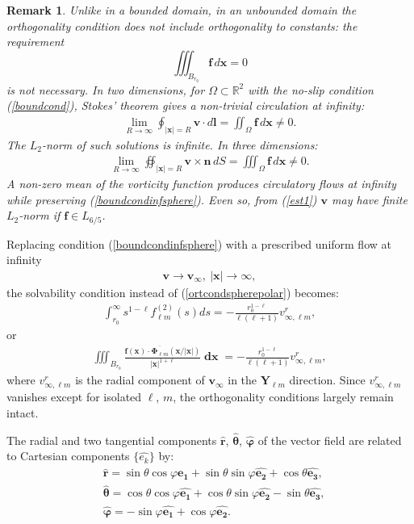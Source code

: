 \documentclass[a4paper]{article}
\newcommand{\R}{\mathbb{R}}
\newcommand{\bx}{\mathbf{x}}
\newcommand{\bff}{\mathbf{f}}
\newcommand{\dx}{\operatorname{\mathbf{dx}}}
\newcommand{\bv}{\mathbf{v}}
\newcommand{\bn}{\mathbf{n}}
\newtheorem{remark*}{Remark}[]
\begin{document}
\begin{remark*}
Unlike in a bounded domain, in an unbounded domain the orthogonality condition does not include orthogonality to constants: the requirement
$$\iiint_{B_{r_0}}\bff \,d\mathbf{x}=0$$
is not necessary. In two dimensions, for $\Omega \subset \R^2$ with the no-slip condition (\ref{boundcond}), Stokes' theorem gives a non-trivial circulation at infinity:
\begin{align*}
\lim_{R\to\infty}\oint_{\vert\bx\vert=R} \bv \cdot d\mathbf{l} = \iint_{\Omega}\bff \,d\mathbf{x} \neq 0.
\end{align*}
The $L_2$-norm of such solutions is infinite. In three dimensions:
\begin{align*}
\lim_{R\to\infty}\oiint_{\vert\bx\vert=R} \bv \times \bn \, dS = \iiint_{\Omega}\bff \,d\mathbf{x} \neq 0.
\end{align*}
A non-zero mean of the vorticity function produces circulatory flows at infinity while preserving (\ref{boundcondinfsphere}). Even so, from (\ref{est1}) $\bv$ may have finite $L_2$-norm if $\bff \in L_{6/5}$.
\end{remark*}

\vskip 0.5cm
Replacing condition (\ref{boundcondinfsphere}) with a prescribed uniform flow at infinity
\begin{align}
\bv \to \bv_\infty,~|\bx|\to \infty, \label{boundcondinfsphere2}
\end{align}
the solvability condition instead of (\ref{ortcondspherepolar}) becomes:
\begin{align*} 
\int_{r_0}^\infty
s^{1-\ell}  f_{\ell m}^{(2)}(s)ds = - \frac{r_0^{1-\ell}}{\ell (\ell +1)} v_{\infty, \ell m}^{r},
\end{align*}
or
\begin{align*}
\iiint_{B_{r_0}} \frac{\bff(\bx) \cdot \overline{\mathbf {\Phi}_{\ell m}}\left (\bx/|\bx| \right )}
{|\bx|^{1 + \ell}} \dx = - \frac{r_0^{1-\ell}}{\ell (\ell +1)} v_{\infty, \ell m}^{r},
\end{align*}
where $v_{\infty, \ell m}^{r}$ is the radial component of $\bv_\infty$ in the $\mathbf{Y}_{\ell m}$ direction. Since $v_{\infty, \ell m}^{r}$ vanishes except for isolated $\ell$, $m$, the orthogonality conditions largely remain intact.

The radial and two tangential components $\hat{\mathbf{r}}$, $\hat{\boldsymbol{\theta}}$, $\hat{\boldsymbol{\varphi}}$ of the vector field are related to Cartesian components $\{ \hat {e_k}\}$ by:
\begin{align*}
&\hat {\mathbf  r}=\sin \theta \cos \varphi {\boldsymbol {\hat {e_1 }}}+\sin \theta \sin \varphi {\boldsymbol {\hat {e_2 }}}+\cos \theta {\boldsymbol {\hat {e_3}}},\\
&\hat {\mathbf \theta }=\cos \theta \cos \varphi {\boldsymbol {\hat {e_1 }}}+\cos \theta \sin \varphi {\boldsymbol {\hat {e_2 }}}-\sin \theta {\boldsymbol {\hat {e_3}}},\\
&\hat {\mathbf \varphi }=-\sin \varphi {\boldsymbol {\hat {e_1 }}}+\cos \varphi {\boldsymbol {\hat {e_2 }}}.
\end{align*}
\end{document}
